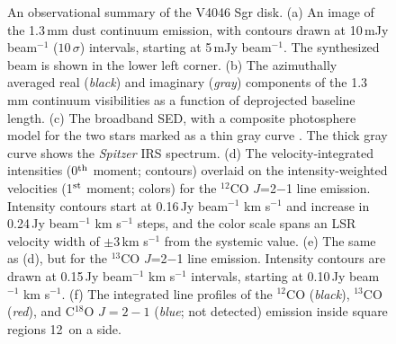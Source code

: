 {\begin{figure}[t!]
 \caption{An observational summary of the V4046
Sgr disk.  (a) An image of the 1.3\,mm dust continuum emission, with contours
drawn at 10\,mJy beam$^{-1}$ ($10$\,$\sigma$) intervals, starting at 5\,mJy
beam$^{-1}$.  The synthesized beam is shown in the lower left corner.  (b) The
azimuthally averaged real ({\it black}) and imaginary ({\it gray}) components
of the 1.3\,mm continuum visibilities as a function of deprojected baseline
length.  (c) The broadband SED, with a composite photosphere model for the two
stars marked as a thin gray curve \citep[see][]{rosenfeld12}.  The thick gray
curve shows the {\it Spitzer} IRS spectrum.  (d) The velocity-integrated
intensities (0$^{\rm th}$ moment; contours) overlaid on the intensity-weighted
velocities (1$^{\rm st}$ moment; colors) for the $^{12}$CO $J$=2$-$1 line
emission.  Intensity contours start at 0.16\,Jy beam$^{-1}$ km s$^{-1}$ and
increase in 0.24\,Jy beam$^{-1}$ km s$^{-1}$ steps, and the color scale spans
an LSR velocity width of $\pm$3\,km s$^{-1}$ from the systemic value.  (e) The
same as (d), but for the $^{13}$CO $J$=2$-$1 line emission.  Intensity contours
are drawn at 0.15\,Jy beam$^{-1}$ km s$^{-1}$ intervals, starting at 0.10\,Jy
beam$^{-1}$ km s$^{-1}$.  (f) The integrated line profiles of the $^{12}$CO
({\it black}), $^{13}$CO ({\it red}), and C$^{18}$O $J=2-1$ ({\it blue}; not
detected) emission inside square regions 12\arcsec\ on a side.
\label{fig:summary}}
\end{figure}

}
